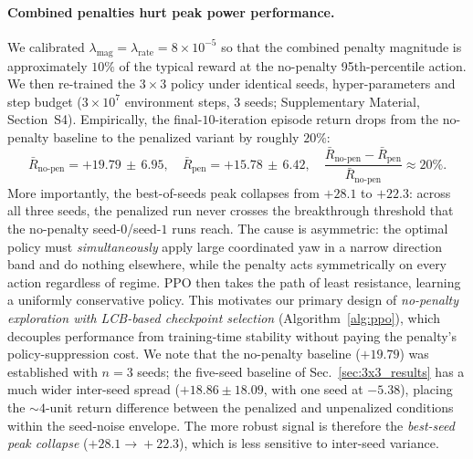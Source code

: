 \documentclass[final,5p,times]{elsarticle}
\begin{document}
\paragraph{Combined penalties hurt peak power performance.}
We calibrated
$\lambda_\mathrm{mag}=\lambda_\mathrm{rate}=8\!\times\!10^{-5}$ so that the
combined penalty magnitude is approximately $10\%$ of the typical reward at
the no-penalty 95th-percentile action. We then re-trained the $3{\times}3$
policy under identical seeds, hyper-parameters and step budget
($3\!\times\!10^{7}$ environment steps, $3$ seeds;
Supplementary Material, Section~S4).
Empirically, the final-$10$-iteration episode return drops from the
no-penalty baseline to the penalized variant by roughly $20\%$:
\begin{equation}
\bar{R}_\mathrm{no\text{-}pen} = +19.79\,\pm\,6.95,
\quad
\bar{R}_\mathrm{pen}           = +15.78\,\pm\,6.42,
\quad
\frac{\bar{R}_\mathrm{no\text{-}pen}-\bar{R}_\mathrm{pen}}{\bar{R}_\mathrm{no\text{-}pen}}
\approx 20\%.
\label{eq:reward_ablation}
\end{equation}
More importantly, the best-of-seeds peak collapses from $+28.1$ to $+22.3$:
across all three seeds, the penalized run never crosses the breakthrough
threshold that the no-penalty seed-$0$/seed-$1$ runs reach. The cause is
asymmetric: the optimal policy must \emph{simultaneously} apply large
coordinated yaw in a narrow direction band and do nothing elsewhere, while
the penalty acts symmetrically on every action regardless of regime. PPO
then takes the path of least resistance, learning a uniformly conservative
policy. This motivates our primary design of \emph{no-penalty exploration
with LCB-based checkpoint selection} (Algorithm~\ref{alg:ppo}), which
decouples performance from training-time stability without paying the
penalty's policy-suppression cost. We note that the no-penalty baseline ($+19.79$) was established with $n{=}3$ seeds; the five-seed baseline of Sec.~\ref{sec:3x3_results} has a much wider inter-seed spread ($+18.86\!\pm\!18.09$, with one seed at $-5.38$), placing the $\sim\!4$-unit return difference between the penalized and unpenalized conditions within the seed-noise envelope. The more robust signal is therefore the \emph{best-seed peak collapse} ($+28.1\!\to\!+22.3$), which is less sensitive to inter-seed variance.
\end{document}
